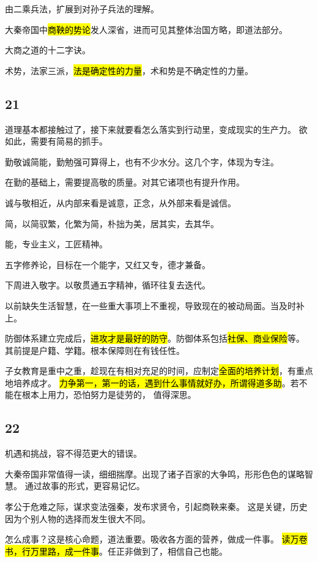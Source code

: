 \hrulefill

由二乘兵法，扩展到对孙子兵法的理解。

大秦帝国中\hl{商鞅的势论}发人深省，进而可见其整体治国方略，即道法部分。

大商之道的十二字诀。

术势，法家三派，\hl{法是确定性的力量}，术和势是不确定性的力量。

\subsection{21}

道理基本都接触过了，接下来就要看怎么落实到行动里，变成现实的生产力。
欲如此，需要有简易的抓手。

勤敬诚简能，勤勉强可算得上，也有不少水分。这几个字，体现为专注。

在勤的基础上，需要提高敬的质量。对其它诸项也有提升作用。

诚与敬相近，从内部来看是诚意，正念，从外部来看是诚信。

简，以简驭繁，化繁为简，朴拙为美，居其实，去其华。

能，专业主义，工匠精神。

五字修养论，目标在一个能字，又红又专，德才兼备。

下周进入敬字。以敬贯通五字精神，循环往复去迭代。

\hrulefill

以前缺失生活智慧，在一些重大事项上不重视，导致现在的被动局面。当及时补上。

防御体系建立完成后，\hl{进攻才是最好的防守}。防御体系包括\hl{社保、商业保险}等。
其前提是户籍、学籍。根本保障则在有钱任性。

子女教育是重中之重，趁现在有相对充足的时间，应制定\hl{全面的培养计划}，有重点地培养成才。
\hl{力争第一，第一的话，遇到什么事情就好办，所谓得道多助}。若不能在根本上用力，恐怕努力是徒劳的，
值得深思。

\subsection{22}

机遇和挑战，容不得范更大的错误。

大秦帝国非常值得一读，细细揣摩。出现了诸子百家的大争鸣，形形色色的谋略智慧。
通过故事的形式，更容易记忆。

孝公于危难之际，谋求变法强秦，发布求贤令，引起商鞅来秦。
这是关键，历史因为个别人物的选择而发生很大不同。

怎么成事？这是核心命题，道法重要。吸收各方面的营养，做成一件事。
\hl{读万卷书，行万里路，成一件事}。任正非做到了，相信自己也能。


